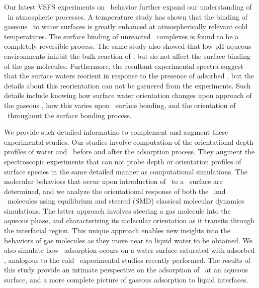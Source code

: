 Our latest VSFS experiments on \suldiox~behavior further expand our understanding of \suldiox~in atmospheric processes.\cite{Ota2011} A temperature study has shown that the binding of gaseous \suldiox~to water surfaces is greatly enhanced at atmospherically relevant cold temperatures. The surface binding of unreacted \suldiox~complexes is found to be a completely reversible process. The same study also showed that low pH aqueous environments inhibit the bulk reaction of \suldiox, but do not affect the surface binding of the gas molecules. Furthermore, the resultant experimental spectra suggest that the surface waters reorient in response to the presence of adsorbed \suldiox, but the details about this reorientation can not be garnered from the experiments.  Such details include knowing how surface water orientation changes upon approach of the gaseous \suldiox, how this varies upon \suldiox~surface bonding, and the orientation of \suldiox~throughout the surface bonding process. 

We provide such detailed informatino to complement and augment these experimental studies. Our studies involve computation of the orientational depth profiles of water and \suldiox~before and after the adsorption process. They augment the spectroscopic experiments that can not probe depth or orientation profiles of surface species in the same detailed manner as computational simulations. The molecular behaviors that occur upon introduction of \suldiox~to a \wat~surface are determined, and we analyze the orientational response of both the \suldiox~and \wat~molecules using equilibrium and steered (SMD) classical molecular dynamics simulations. The latter approach involves steering a gas molecule into the aqueous phase, and characterizing its molecular orientation as it transits through the interfacial region.  This unique approach enables new insights into the behaviors of gas molecules as they move near to liquid water to be obtained. We also simulate how \suldiox~adsorption occurs on a water surface saturated with adsorbed \suldiox, analogous to the cold \suldiox~experimental studies recently performed.\cite{Ota2011} The results of this study provide an intimate perspective on the adsorption of \suldiox~at an aqueous surface, and a more complete picture of gaseous adsorption to liquid interfaces.
